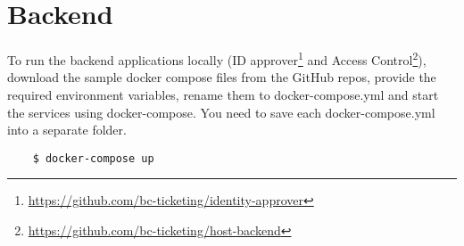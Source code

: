 \section{Backend}
To run the backend applications locally (ID approver\footnote{\href{https://github.com/bc-ticketing/identity-approver}{https://github.com/bc-ticketing/identity-approver}} and Access Control\footnote{\href{https://github.com/bc-ticketing/host-backend}{https://github.com/bc-ticketing/host-backend}}), download the sample docker compose files from the GitHub repos, provide the required environment variables, rename them to docker-compose.yml and start the services using docker-compose. You need to save each docker-compose.yml into a separate folder.

\begin{lstlisting}
    $ docker-compose up
\end{lstlisting}
